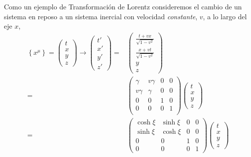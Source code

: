 \begin{frame}


Como un ejemplo de Transformación de Lorentz consideremos el cambio de un sistema en reposo a un sistema inercial con velocidad \emph{constante},  $v$, a lo largo del eje $x$,
\begin{align}
\label{eq:147}
  \left\{x^\mu\right\}=\begin{pmatrix}
    t\\
    x\\
    y\\
    z
  \end{pmatrix}\to
  \begin{pmatrix}
    t'\\
    x'\\
    y'\\
    z'
  \end{pmatrix}=&
  \begin{pmatrix}
  \displaystyle{ \frac{t+vx}{\sqrt{1-v^2}} }\\
  \displaystyle{ \frac{x+vt}{\sqrt{1-v^2}} }\\
    y\\
    z
  \end{pmatrix} \nonumber\\
=&\begin{pmatrix}
  \gamma   & v \gamma & 0 & 0 \\
  v \gamma & \gamma & 0 & 0\\
  0 & 0 & 1 & 0 \\
    0 & 0 & 0 & 1 \\
   \end{pmatrix} 
\begin{pmatrix}
    t\\
    x\\
    y\\
    z
  \end{pmatrix}\nonumber\\
  =&
  \begin{pmatrix}
    \cosh\xi&\sinh\xi&0&0\\
    \sinh\xi&\cosh\xi&0&0\\
    0     &  0  &1&0\\
    0     &  0  &0&1
  \end{pmatrix}
  \begin{pmatrix}
    t\\
    x\\
    y\\
    z
  \end{pmatrix} \nonumber\\

\end{align}
\end{frame}
